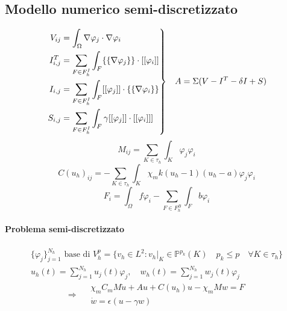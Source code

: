 \documentclass[a4paper]{article}
\theoremstyle{definition}
\newenvironment{rcases}
{\left.\begin{aligned}}
	{\end{aligned}\right\rbrace}
\begin{document}
\vspace{5mm}

\subsection{Modello numerico semi-discretizzato}

	\vspace{5mm}
	 \begin{equation}
	 \begin{rcases}
	 V_{ij} &= \int_{\Omega}\nabla\varphi_j \cdot \nabla \varphi_i 
	 \\ I_{i,j}^T &= \sum_{F \in F_h^I} \int_{F} \{\{\nabla\varphi_j\}\} \cdot [[\varphi_i]] 
	\\ I_{i,j} &= \sum_{F \in F_h^I} \int_{F} [[\varphi_j]] \cdot \{\{\nabla \varphi_i\}\}
	 \\S_{i,j} &= \sum_{F \in F_h^I} \int_{F} \gamma [[\varphi_j]] \cdot [[\varphi_i]]]
	 \end{rcases}
	 \quad A = \Sigma(V -I^T - \delta I + S)
	\end{equation}
	\begin{equation}
	M_{ij} = \sum_{K \in \tau_h}\int_K
	\varphi_j\varphi_i
	\end{equation}
	\begin{equation}
	C(u_h)_{ij} = - \sum_{K \in \tau_h} \int_K \chi_m k(u_h-1)(u_h-a)\varphi_j\varphi_i
	\end{equation}
	\begin{equation}
	F_i = \int_{\Omega} f\varphi_i - \sum_{F \in F_h^B} \int_F b\varphi_i
	\end{equation}
	
	\vspace{3mm}
\paragraph{Problema semi-discretizzato} 

\begin{equation*}
\begin{gathered}
\{\varphi_j\}_{j=1}^{N_h} \text{ base di } V_h^p = \{v_h \in L^2 : v_h|_K \in \mathbb{P}^{p_k}(K) \quad p_k \leq p \quad \forall K \in \tau_h \}
\\
u_h(t) = \sum_{j=1}^{N_h} u_j(t)\varphi_j, \quad w_h(t) = \sum_{j=1}^{N_h}w_j(t)\varphi_j
\end{gathered}
\end{equation*}
\vspace{3mm}
\begin{equation}
\Rightarrow \quad  \begin{gathered}\boxed{\chi_mC_m M \dot{u} +  A u + C(u_h) u -\chi_mMw=F}
	\\
	\boxed{\dot{w} = \epsilon(u-\gamma w)}
	\end{gathered}
\end{equation}
\vspace{5mm}
\end{document}
